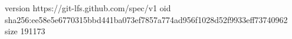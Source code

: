 version https://git-lfs.github.com/spec/v1
oid sha256:ee58e5e6770315bbd441ba073ef7857a774ad956f1028d52f9933eff73740962
size 191173
